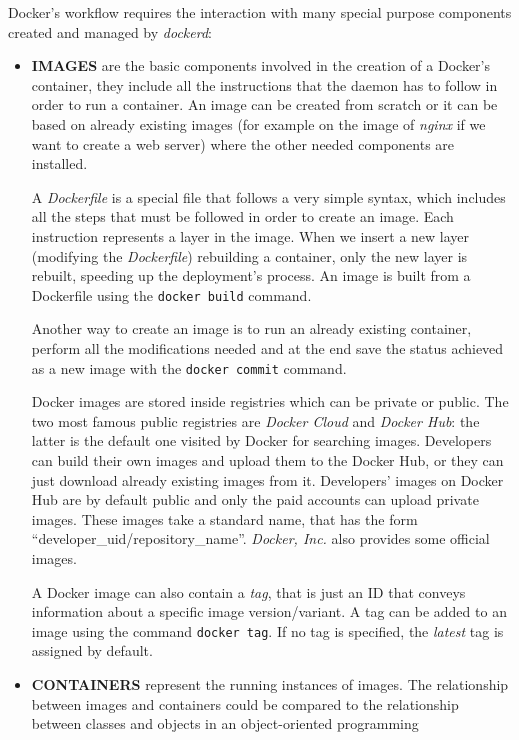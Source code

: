 \documentclass[a4paper,12pt]{article}
\newcommand{\code}[1]{\lstinline|#1|}
\begin{document}
Docker's workflow requires the interaction with many special purpose components
created and managed by \textit{dockerd}:
\begin{itemize}
  \item \textbf{IMAGES} are the basic components involved in the creation of a
  Docker's container, they include all the instructions that the daemon has to
  follow in order to run a container. An image can be created from scratch or it
  can be based on already existing images (for example on the image of
  \textit{nginx} if we want to create a web server) where the other needed
  components are installed. \par A \textit{Dockerfile} is a special file that
  follows a very simple syntax, which includes all the steps that must be
  followed in order to create an image. Each instruction represents a layer in
  the image. When we insert a new layer (modifying the \textit{Dockerfile})
  rebuilding a container, only the new layer is rebuilt, speeding up the
  deployment's process. An image is built from a Dockerfile using the
  \code{docker build} command. \par Another way to create an image is to run
  an already existing container, perform all the modifications needed and at the
  end save the status achieved as a new image with the \code{docker commit}
  command.\par Docker images are stored inside registries which can be private
  or public. The two most famous public registries are \textit{Docker Cloud} and
  \textit{Docker Hub}: the latter is the default one visited by Docker for
  searching images. Developers can build their own images and upload them to the
  Docker Hub, or they can just download already existing images from it.
  Developers' images on Docker Hub are by default public and only the paid accounts
  can upload private images. These images take a standard name, that has the
  form ``developer\_uid/repository\_name''. \textit{Docker, Inc.} also provides some
  official images. \par A Docker image can also contain a \textit{tag}, that is
  just an ID that conveys information about a specific image version/variant. A
  tag can be added to an image using the command \code{docker tag}. If no tag
  is specified, the \textit{latest} tag is assigned by default.  
  \item \textbf{CONTAINERS} represent the running instances of images. The
  relationship between images and containers could be compared to the
  relationship between classes and objects in an object-oriented programming

\end{itemize}
\end{document}

